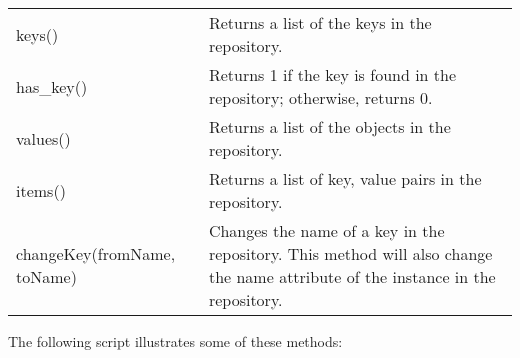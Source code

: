 \documentclass[letterpaper,10pt,english]{sphinxmanual}
\begin{document}
\begin{savenotes}\sphinxattablestart
\centering
\begin{tabulary}{\linewidth}[t]{|T|T|}
\hline
{}\relax &\relax \\
\hline
keys()
&
Returns a list of the keys in the repository.
\\
\hline
has\_key()
&
Returns 1 if the key is found in the repository; otherwise, returns 0.
\\
\hline
values()
&
Returns a list of the objects in the repository.
\\
\hline
items()
&
Returns a list of key, value pairs in the repository.
\\
\hline
changeKey(fromName, toName)
&
Changes the name of a key in the repository. This method will also change the name attribute of the instance in the repository.
\\
\hline
\end{tabulary}
\par
\sphinxattableend\end{savenotes}

The following script illustrates some of these methods:
\end{document}
